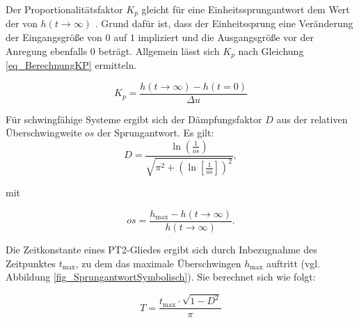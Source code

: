 Der Proportionalitätsfaktor $K_p$ gleicht für eine Einheitssprungantwort dem Wert der von $h(t\rightarrow \infty)$ \cite[S.60]{ProfMueller}.
Grund dafür ist, dass der Einheitssprung eine Veränderung der Eingangsgröße von $0$ auf $1$ impliziert und die Ausgangsgröße vor der Anregung ebenfalls $0$ beträgt.
Allgemein lässt sich $K_p$ nach Gleichung \ref{eq_BerechnungKP} ermitteln.

\begin{equation} \label{eq_BerechnungKP}
    K_p = \frac{h(t\rightarrow \infty) - h(t=0)}{\Delta u}
\end{equation}

Für schwingfähige Systeme ergibt sich der Dämpfungsfaktor $D$ aus der relativen Überschwingweite $os$ der Sprungantwort.
Es gilt:
\begin{equation} \label{eq_BerechnungD}
    D = \frac{\ln \left(\frac{1}{os}\right)}{\sqrt{\pi^2+\left(\ln\left[\frac{1}{os}\right]\right)^2}},
\end{equation}

\vspace*{-\baselineskip}mit

\begin{equation} \label{eq_overshoot}
    os = \frac{h_{\mathrm{max}}-h(t\rightarrow \infty)}{h(t\rightarrow \infty)}.
\end{equation}

Die Zeitkonstante eines PT2-Gliedes ergibt sich durch Inbezugnahme des Zeitpunktes $t_{\mathrm{max}}$, zu dem das maximale Überschwingen $h_{\mathrm{max}}$ auftritt (vgl. Abbildung \ref{fig_SprungantwortSymbolisch}).
Sie berechnet sich wie folgt:

\begin{equation} \label{eq_BerechnungT}
    T = \frac{t_{\mathrm{max}} \cdot \sqrt{1-D^2}}{\pi}
\end{equation}



